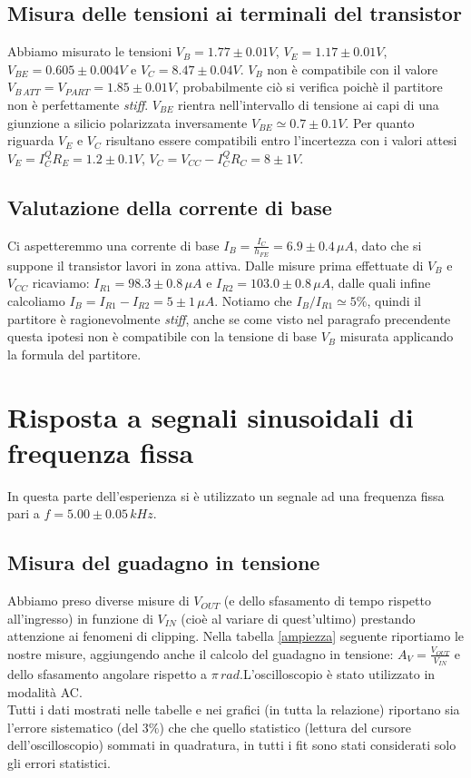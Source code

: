 \documentclass[10pt,a4paper]{article}
\begin{document}
\subsection{Misura delle tensioni ai terminali del transistor}
Abbiamo misurato le tensioni $V_B= 1.77\pm0.01V$, $V_E= 1.17\pm0.01V$, $V_{BE}= 0.605\pm0.004V$ e $V_C= 8.47\pm0.04V$. $V_B$ non è compatibile con il valore $V_{B\,ATT}= V_{PART}=1.85 \pm 0.01V$, probabilmente ciò si verifica poichè il partitore non è perfettamente \emph{stiff}. $V_{BE}$ rientra nell'intervallo di tensione ai capi di una giunzione a silicio polarizzata inversamente  $V_{BE} \simeq 0.7 \pm 0.1 V$. Per quanto riguarda $V_E$ e $V_C$ risultano essere compatibili entro l'incertezza con i valori attesi $V_E=I_C^Q R_E = 1.2 \pm 0.1 V$, $V_C=V_{CC}-I_C^Q R_C = 8 \pm 1 V$.


\subsection{Valutazione della corrente di base}
Ci aspetteremmo una corrente di base $I_B=\frac{I_C}{h_{FE}} = 6.9 \pm 0.4 \, \mu A$, dato che si suppone il transistor lavori in zona attiva. Dalle misure prima effettuate di $V_B$ e $V_{CC}$ ricaviamo: $I_{R1} = 98.3\pm0.8 \, \mu A$ e $I_{R2} = 103.0\pm0.8 \, \mu A$, dalle quali infine calcoliamo $I_B=I_{R1}-I_{R2}= 5\pm1 \,\mu A$. Notiamo che $I_B/I_{R1}\simeq 5\%$, quindi il partitore è ragionevolmente \emph{stiff}, anche se come visto nel paragrafo precendente questa ipotesi non è compatibile con la tensione di base $V_B$ misurata applicando la formula del partitore.
 
\section{Risposta a segnali sinusoidali di frequenza fissa}
In questa parte dell'esperienza si è utilizzato un segnale ad una frequenza fissa pari a $f= 5.00\pm0.05 \, kHz$.

\subsection{Misura del guadagno in tensione}
Abbiamo preso diverse misure di $V_{OUT}$ (e dello sfasamento di tempo rispetto all'ingresso) in funzione di $V_{IN}$ (cioè al variare di quest'ultimo) prestando attenzione ai fenomeni di clipping. Nella tabella \ref{ampiezza} seguente riportiamo le nostre misure, aggiungendo anche il calcolo del guadagno in tensione: $A_V=\frac{V_{OUT}}{V_{IN}}$ e dello sfasamento angolare rispetto a $\pi \,rad$.L'oscilloscopio è stato utilizzato in modalità AC.\\
Tutti i dati mostrati nelle tabelle e nei grafici (in tutta la relazione) riportano sia l'errore sistematico (del $3\%$) che che quello statistico (lettura del cursore dell'oscilloscopio) sommati in quadratura, in tutti i fit sono stati considerati solo gli errori statistici.
\end{document}
